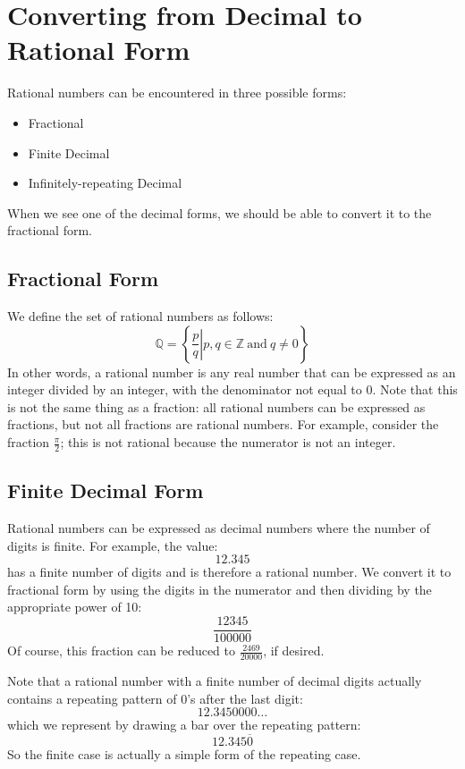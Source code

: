 \documentclass[letterpaper,12pt,fleqn]{article}
\begin{document}
\section*{Converting from Decimal to Rational Form}

Rational numbers can be encountered in three possible forms:
\begin{itemize}
\item Fractional
\item Finite Decimal
\item Infinitely-repeating Decimal
\end{itemize}
When we see one of the decimal forms, we should be able to convert it to the
fractional form.

\subsection*{Fractional Form}

We define the set of rational numbers as follows:
\[\mathbb{Q}=\left\{\left.\frac{p}{q}\right|p,q\in\mathbb{Z}\ \mbox{and}\ q\ne0\right\}\]
In other words, a rational number is any real number that can be expressed as
an integer divided by an integer, with the denominator not equal to 0. Note
that this is not the same thing as a fraction: all rational numbers can be
expressed as fractions, but not all fractions are rational numbers. For
example, consider the fraction $\frac{\pi}{2}$; this is not rational because
the numerator is not an integer.

\subsection*{Finite Decimal Form}

Rational numbers can be expressed as decimal numbers where the number of digits
is finite. For example, the value:
\[12.345\]
has a finite number of digits and is therefore a rational number. We convert it
to fractional form by using the digits in the numerator and then dividing by
the appropriate power of 10:
\[\frac{12345}{100000}\]
Of course, this fraction can be reduced to $\frac{2469}{20000}$, if desired.

Note that a rational number with a finite number of decimal digits actually
contains a repeating pattern of 0's after the last digit:
\[12.3450000\ldots\]
which we represent by drawing a bar over the repeating pattern:
\[12.345\overline{0}\]
So the finite case is actually a simple form of the repeating case.
\end{document}
